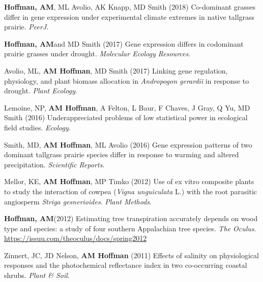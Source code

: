 \documentclass{cv}
\begin{document}
\begin{pubenum}
\item\textbf{Hoffman, AM}, ML Avolio, AK Knapp, MD Smith (2018) Co-dominant grasses differ in gene expression under experimental climate extremes in native tallgrass prairie. \textit{PeerJ}. 

\item\textbf{Hoffman, AM}\footnotemark[1] and MD Smith (2017) Gene expression differs in codominant prairie grasses under drought. \textit{Molecular Ecology Resources}. 

\item Avolio, ML, \textbf{AM Hoffman}, MD Smith (2017) Linking gene regulation, physiology, and plant biomass allocation in \textit{Andropogon gerardii} in response to drought. \textit{Plant Ecology}. 

\item Lemoine, NP, \textbf{AM Hoffman}, A Felton, L Baur, F Chaves, J Gray, Q Yu, MD Smith (2016) Underappreciated problems of low statistical power in ecological field studies. \textit{Ecology}. 

\item Smith, MD, \textbf{AM Hoffman}, ML Avolio (2016) Gene expression patterns of two dominant tallgrass prairie species differ in response to warming and altered precipitation. \textit{Scientific Reports}. 

\item Mellor, KE, \textbf{AM Hoffman}, MP Timko (2012) Use of ex vitro composite plants to study the interaction of cowpea (\textit{Vigna unguiculata} L.) with the root parasitic angiosperm \textit{Striga gesnerioides}. \textit{Plant Methods}. 

\sloppy %
\item\textbf{Hoffman, AM}\footnotemark[1] (2012) Estimating tree transpiration accurately depends on wood type and species: a study of four southern Appalachian tree species. \textit{The Oculus}. \href{https://issuu.com/theoculus/docs/spring2012}{https://issuu.com/theoculus/docs/spring2012}

\item Zinnert, JC, JD Nelson, \textbf{AM Hoffman} (2011) Effects of salinity on physiological responses and the photochemical reflectance index in two co-occurring coastal shrubs. \textit{Plant \& Soil}. 

\end{pubenum}
\end{document}
